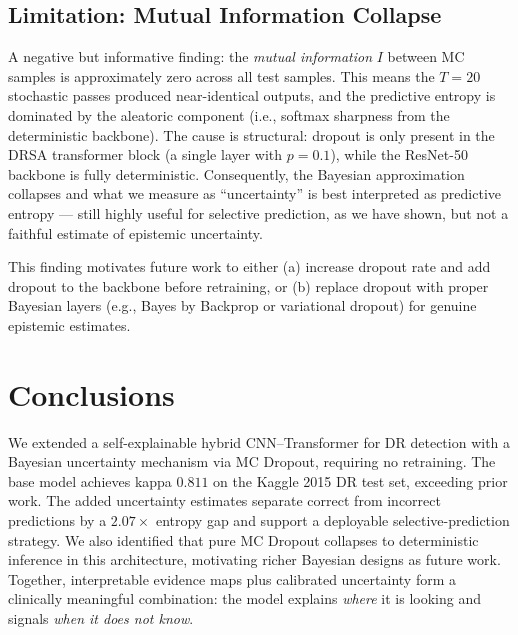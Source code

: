 \documentclass[conference]{IEEEtran}
\begin{document}
\subsection{Limitation: Mutual Information Collapse}
A negative but informative finding: the \emph{mutual information} $I$ between MC samples is approximately zero across all test samples. This means the $T{=}20$ stochastic passes produced near-identical outputs, and the predictive entropy is dominated by the aleatoric component (i.e., softmax sharpness from the deterministic backbone). The cause is structural: dropout is only present in the DRSA transformer block (a single layer with $p{=}0.1$), while the ResNet-50 backbone is fully deterministic. Consequently, the Bayesian approximation collapses and what we measure as ``uncertainty'' is best interpreted as predictive entropy --- still highly useful for selective prediction, as we have shown, but not a faithful estimate of epistemic uncertainty.

This finding motivates future work to either (a) increase dropout rate and add dropout to the backbone before retraining, or (b) replace dropout with proper Bayesian layers (e.g., Bayes by Backprop \cite{blundell2015bbb} or variational dropout) for genuine epistemic estimates.

\section{Conclusions}
We extended a self-explainable hybrid CNN--Transformer for DR detection with a Bayesian uncertainty mechanism via MC Dropout, requiring no retraining. The base model achieves kappa $0.811$ on the Kaggle 2015 DR test set, exceeding prior work. The added uncertainty estimates separate correct from incorrect predictions by a $2.07\times$ entropy gap and support a deployable selective-prediction strategy. We also identified that pure MC Dropout collapses to deterministic inference in this architecture, motivating richer Bayesian designs as future work. Together, interpretable evidence maps plus calibrated uncertainty form a clinically meaningful combination: the model explains \emph{where} it is looking and signals \emph{when it does not know}.
\end{document}
